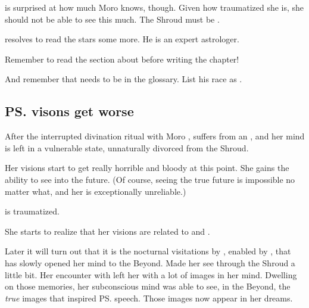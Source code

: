 \Nasshikerr{} is surprised at how much Moro knows, though. 
Given how traumatized she is, she should not be able to see this much. 
The Shroud must be . 

\Nasshikerr{} resolves to read the stars some more. 
He is an expert astrologer. 

Remember to read the section about  before writing the chapter!

And remember that \Nasshikerr{} needs to be in the glossary. 
List his race as \quo{\Taortha}. 











\subsection{\ps{\Tiroco} visons get worse}
After the interrupted divination ritual with Moro \Cobrel, \Tiroco{} suffers from an , and her mind is left in a vulnerable state, unnaturally divorced from the Shroud. 

Her visions start to get really horrible and bloody at this point. She gains the ability to see into the future. (Of course, seeing the true future is impossible no matter what, and her  is exceptionally unreliable.)


\Tiroco{} is traumatized.

She starts to realize that her visions are related to \Icor{} and \Psyrex.

Later it will turn out that it is the nocturnal visitations by \Icor, enabled by \Psyrex, that has slowly opened her mind to the Beyond. 
Made her see through the Shroud a little bit. 
Her encounter with \Uswa{} left her with a lot of images in her mind. 
Dwelling on those memories, her subconscious mind was able to see, in the Beyond, the \emph{true} images that inspired \ps{\Uswa} speech. 
Those images now appear in her dreams. 







